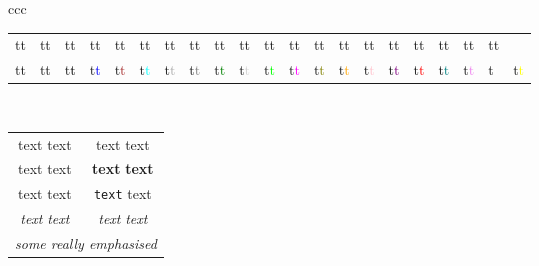 \documentclass[fleqn,a4paper,11pt]{article}
\begin{document}
\begin{center}
\begin{longtable}{ccc}
{\begin{tabular}{ccccccccccccccccccccc}
{\color{Tomato4} t}\textcolor{Tomato4}{t} &
{\color{Turquoise1} t}\textcolor{Turquoise1}{t} &
{\color{Turquoise2} t}\textcolor{Turquoise2}{t} &
{\color{Turquoise3} t}\textcolor{Turquoise3}{t} &
{\color{Turquoise4} t}\textcolor{Turquoise4}{t} &
{\color{VioletRed1} t}\textcolor{VioletRed1}{t} &
{\color{VioletRed2} t}\textcolor{VioletRed2}{t} &
{\color{VioletRed3} t}\textcolor{VioletRed3}{t} &
{\color{VioletRed4} t}\textcolor{VioletRed4}{t} &
{\color{Wheat1} t}\textcolor{Wheat1}{t} &
{\color{Wheat2} t}\textcolor{Wheat2}{t} &
{\color{Wheat3} t}\textcolor{Wheat3}{t} &
{\color{Wheat4} t}\textcolor{Wheat4}{t} &
{\color{Yellow1} t}\textcolor{Yellow1}{t} &
{\color{Yellow2} t}\textcolor{Yellow2}{t} &
{\color{Yellow3} t}\textcolor{Yellow3}{t} &
{\color{Yellow4} t}\textcolor{Yellow4}{t} &
{\color{Gray0} t}\textcolor{Gray0}{t} &
{\color{Green0} t}\textcolor{Green0}{t} &
{\color{Grey0} t}\textcolor{Grey0}{t} \\
{\color{Maroon0} t}\textcolor{Maroon0}{t} &
{\color{Purple0} t}\textcolor{Purple0}{t} &
{\color{black} t}\textcolor{black}{t} &
{\color{blue} t}\textcolor{blue}{t} &
{\color{brown} t}\textcolor{brown}{t} &
{\color{cyan} t}\textcolor{cyan}{t} &
{\color{darkgray} t}\textcolor{darkgray}{t} &
{\color{gray} t}\textcolor{gray}{t} &
{\color{green} t}\textcolor{green}{t} &
{\color{lightgray} t}\textcolor{lightgray}{t} &
{\color{lime} t}\textcolor{lime}{t} &
{\color{magenta} t}\textcolor{magenta}{t} &
{\color{olive} t}\textcolor{olive}{t} &
{\color{orange} t}\textcolor{orange}{t} &
{\color{pink} t}\textcolor{pink}{t} &
{\color{purple} t}\textcolor{purple}{t} &
{\color{red} t}\textcolor{red}{t} &
{\color{teal} t}\textcolor{teal}{t} &
{\color{violet} t}\textcolor{violet}{t} &
{\color{white} t}\textcolor{white}{t} &
{\color{yellow} t}\textcolor{yellow}{t} \\
\end{tabular}} \\
    \begin{tabular}{cc}
    \textmd{text} {\mdseries text} & %
    \textrm{text} {\rmfamily text} \\ %
    \textup{text} {\upshape text} & %
    \textbf{text} {\bfseries text} \\ %
    \textsf{text} {\sffamily text} & %
    \texttt{text} {\ttfamily text} \\ %
    \textit{text} {\itshape text} & %
    \textsl{text} {\slshape text} \\ %
    \multicolumn{2}{c}{\emph{some \emph{really} emphasised}} \\ %

\end{tabular}
\end{longtable}
\end{center}
\end{document}
